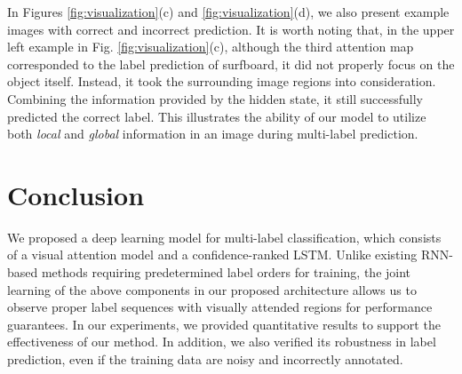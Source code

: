 \documentclass[letterpaper]{article} %
\begin{document}
In Figures \ref{fig:visualization}(c) and \ref{fig:visualization}(d), we also present example images with correct and incorrect prediction. It is worth noting that, in the upper left example in Fig. \ref{fig:visualization}(c), although the third attention map corresponded to the label prediction of surfboard, it did not properly focus on the object itself. Instead, it took the surrounding image regions into consideration. Combining the information provided by the hidden state, it still successfully predicted the correct label. This illustrates the ability of our model to utilize both \emph{local} and \emph{global} information in an image during multi-label prediction. 

\section{Conclusion}
We proposed a deep learning model for multi-label classification, which consists of a visual attention model and a confidence-ranked LSTM. Unlike existing RNN-based methods requiring predetermined label orders for training, the joint learning of the above components in our proposed architecture allows us to observe proper label sequences with visually attended regions for performance guarantees. In our experiments, we provided quantitative results to support the effectiveness of our method. In addition, we also verified its robustness in label prediction, even if the training data are noisy and incorrectly annotated.



\end{document}
